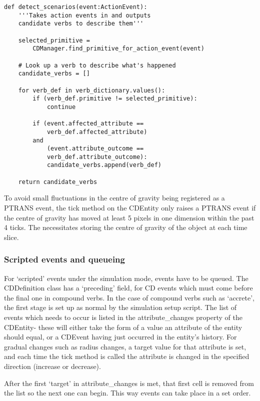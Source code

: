 \documentclass[dissertation.tex]{subfiles}
\begin{document}
\begin{lstlisting}[frame=single,caption={CDManager.detect\_scenarios method}]
def detect_scenarios(event:ActionEvent):
    '''Takes action events in and outputs
    candidate verbs to describe them'''
    
    selected_primitive =
        CDManager.find_primitive_for_action_event(event)            

    # Look up a verb to describe what's happened
    candidate_verbs = []

    for verb_def in verb_dictionary.values():
        if (verb_def.primitive != selected_primitive):
            continue

        if (event.affected_attribute ==
            verb_def.affected_attribute)
        and
            (event.attribute_outcome ==
            verb_def.attribute_outcome):
            candidate_verbs.append(verb_def)
    
    return candidate_verbs
\end{lstlisting}


    To avoid small fluctuations in the centre of gravity being registered as a PTRANS event, the tick method on the CDEntity only raises a PTRANS event if the centre of gravity has moved at least 5 pixels in one dimension within the past 4 ticks. The necessitates storing the centre of gravity of the object at each time slice.

    \subsubsection{Scripted events and queueing}
    For `scripted' events under the simulation mode, events have to be queued. The CDDefinition class has a `preceding' field, for CD events which must come before the final one in compound verbs. In the case of compound verbs such as `accrete', the first stage is set up as normal by the simulation setup script. The list of events which needs to occur is listed in the attribute\_changes property of the CDEntity- these will either take the form of a value an attribute of the entity should equal, or a CDEvent having just occurred in the entity's history. For gradual changes such as radius changes, a target value for that attribute is set, and each time the tick method is called the attribute is changed in the specified direction (increase or decrease).

    After the first `target' in attribute\_changes is met, that first cell is removed from the list so the next one can begin. This way events can take place in a set order.
\end{document}
